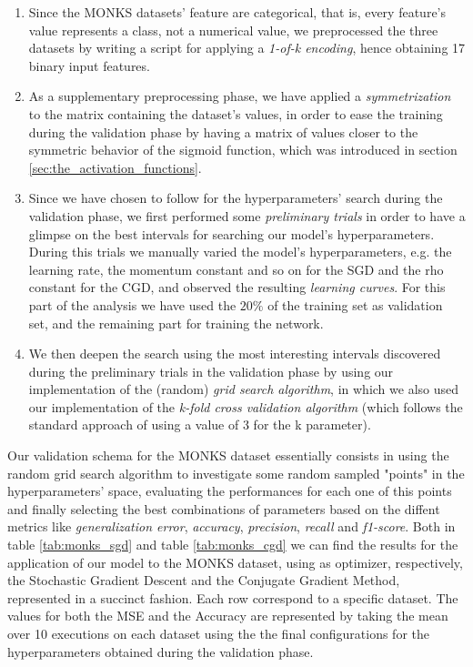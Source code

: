         \begin{enumerate}
            \item Since the MONKS datasets’ feature are categorical, that is, every feature’s value represents
            a class, not a numerical value, we preprocessed the three datasets by writing a script
            for applying a \textit{1-of-k encoding}, hence obtaining 17 binary input features.
            \item As a supplementary preprocessing phase, we have applied a \textit{symmetrization} to the
            matrix containing the dataset’s values, in order to ease the training during the validation phase
            by having a matrix of values closer to the symmetric behavior of the sigmoid function, which was
            introduced in section \ref{sec:the_activation_functions}.
            \item Since we have chosen to follow \cite{Bergstra:2012:RSH:2188385.2188395} for the
            hyperparameters' search during the validation phase, we first performed some
            \textit{preliminary trials} in order to have a glimpse on the best intervals for searching our
            model's hyperparameters. During this trials we manually varied the model's hyperparameters, e.g.
            the learning rate, the momentum constant and so on for the SGD and the rho constant for the CGD,
            and observed the resulting \textit{learning curves}. For this part of the analysis we have used
            the $20\%$ of the training set as validation set, and the remaining part for training the network.
            \item We then deepen the search using the most interesting intervals discovered during the
            preliminary trials in the validation phase by using our implementation of the (random)
            \textit{grid search algorithm}, in which we also used our implementation of the
            \textit{k-fold cross validation algorithm} (which follows the standard approach of using a value
            of 3 for the k parameter).
        \end{enumerate}

        Our validation schema for the MONKS dataset essentially consists in using the random grid
        search
        algorithm to investigate some random sampled "points" in the hyperparameters' space, evaluating the
        performances for each one of this points and finally selecting the best combinations of parameters
        based
        on the diffent metrics like \textit{generalization error}, \textit{accuracy}, \textit{precision},
        \textit{recall} and \textit{f1-score}. Both in table \ref{tab:monks_sgd} and table
        \ref{tab:monks_cgd} we can find the results for the application of our model to the MONKS dataset,
        using as optimizer, respectively, the Stochastic Gradient Descent and the Conjugate Gradient Method,
        represented in a succinct fashion. Each row correspond to a specific dataset. The values for both the
        MSE and the Accuracy are represented by taking the mean over 10 executions on each dataset using the
        the final configurations for the hyperparameters obtained during the validation phase.

